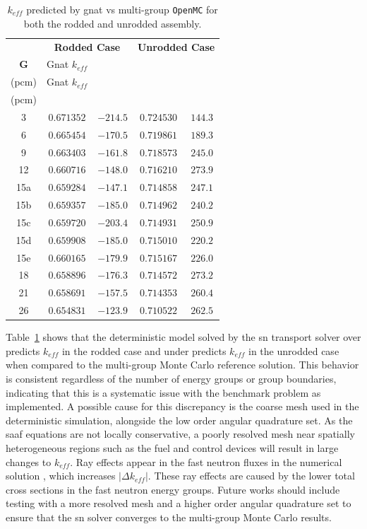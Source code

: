 \begin{table}[H]
    \singlespacing
    \centering
    \caption{$k_{eff}$ predicted by \acrshort{gnat} vs multi-group \texttt{OpenMC} for both the rodded and unrodded assembly.}
    \begin{tabular}{|c|cccc|}
        \hline
        & \multicolumn{2}{c}{\textbf{Rodded Case}} & \multicolumn{2}{c|}{\textbf{Unrodded Case}}\\
        \textbf{G} & Gnat $k_{eff}$ & \makecell{$\Delta k_{eff}$ \\ (pcm)} & Gnat $k_{eff}$ & \makecell{$\Delta k_{eff}$ \\ (pcm)}\\
        \hline
        3   & $0.671352$ & $-214.5$ & $0.724530$ & $144.3$\\
        6   & $0.665454$ & $-170.5$ & $0.719861$ & $189.3$\\
        9   & $0.663403$ & $-161.8$ & $0.718573$ & $245.0$\\
        12  & $0.660716$ & $-148.0$ & $0.716210$ & $273.9$\\
        15a & $0.659284$ & $-147.1$ & $0.714858$ & $247.1$\\
        15b & $0.659357$ & $-185.0$ & $0.714962$ & $240.2$\\
        15c & $0.659720$ & $-203.4$ & $0.714931$ & $250.9$\\
        15d & $0.659908$ & $-185.0$ & $0.715010$ & $220.2$\\
        15e & $0.660165$ & $-179.9$ & $0.715167$ & $226.0$\\
        18  & $0.658896$ & $-176.3$ & $0.714572$ & $273.2$\\
        21  & $0.658691$ & $-157.5$ & $0.714353$ & $260.4$\\
        26  & $0.654831$ & $-123.9$ & $0.710522$ & $262.5$\\
        \hline
    \end{tabular}
    \label{table:k_eff_gnat_vs_mc}
\end{table}
Table~\ref{table:k_eff_gnat_vs_mc} shows that the deterministic model solved by the \acrshort{sn} transport solver over predicts $k_{eff}$ in the rodded case and under predicts $k_{eff}$ in the unrodded case when compared to the multi-group Monte Carlo reference solution. This behavior is consistent regardless of the number of energy groups or group boundaries, indicating that this is a systematic issue with the benchmark problem as implemented. A possible cause for this discrepancy is the coarse mesh used in the deterministic simulation, alongside the low order angular quadrature set. As the \acrshort{saaf} equations are not locally conservative, a poorly resolved mesh near spatially heterogeneous regions such as the fuel and control devices will result in large changes to $k_{eff}$. Ray effects appear in the fast neutron fluxes in the numerical solution \cite{ks_2024_subcritical}, which increases $|\Delta k_{eff}|$. These ray effects are caused by the lower total cross sections in the fast neutron energy groups. Future works should include testing with a more resolved mesh and a higher order angular quadrature set to ensure that the \acrshort{sn} solver converges to the multi-group Monte Carlo results. 


